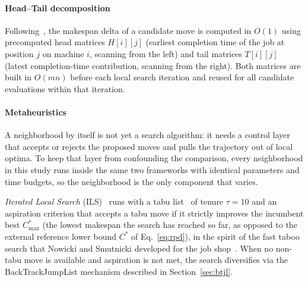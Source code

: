 \documentclass[preprint,12pt,authoryear]{elsarticle}
\begin{document}
\paragraph{Head--Tail decomposition}
Following~\citep{wodecki04}, the makespan delta of a candidate move is
computed in $O(1)$ using precomputed head matrices $H[i][j]$ (earliest
completion time of the job at position $j$ on machine $i$, scanning
from the left) and tail matrices $T[i][j]$ (latest completion-time
contribution, scanning from the right). Both matrices are built in
$O(mn)$ before each local search iteration and reused for all
candidate evaluations within that iteration.

\paragraph{Metaheuristics}
A neighborhood by itself is not yet a search algorithm: it needs a
control layer that accepts or rejects the proposed moves and pulls the
trajectory out of local optima. To keep that layer from confounding
the comparison, every neighborhood in this study runs inside the same
two frameworks with identical parameters and time budgets, so the
neighborhood is the only component that varies.

\emph{Iterated Local Search} (ILS)~\citep{lourenco2003iterated} runs
with a tabu list~\citep{glover1989} of tenure $\tau = 10$ and an
aspiration criterion that accepts a tabu move if it strictly improves
the incumbent best $C_{\max}^*$ (the lowest makespan the search has
reached so far, as opposed to the external reference lower bound $C^*$
of Eq.~\eqref{eq:rpd}), in the spirit of the fast taboo search that
Nowicki and Smutnicki developed for the job shop~\citep{nowicki96ms}.
When no non-tabu move is available and aspiration is not met, the
search diversifies via the BackTrackJumpList mechanism described in
Section~\ref{sec:btjl}.
\end{document}
